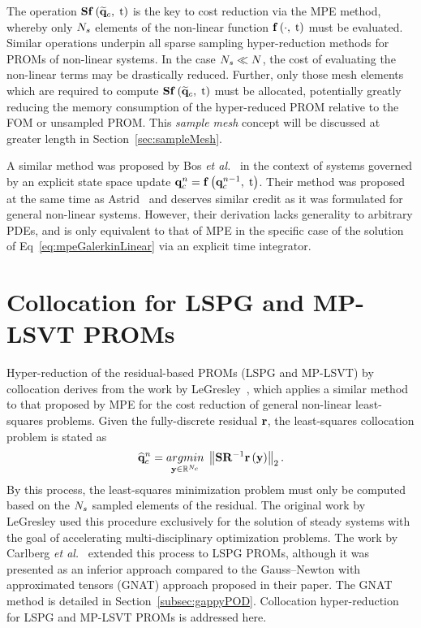 The operation $\mathbf{S} \mathbf{f} \left(\mathbf{\widetilde{q}}_{c}, \; \text{t}\right)$ is the key to cost reduction via the MPE method, whereby only $N_s$ elements of the non-linear function $\mathbf{f} \left(\cdot, \; \text{t}\right)$ must be evaluated. Similar operations underpin all sparse sampling hyper-reduction methods for PROMs of non-linear systems. In the case $N_s \ll N$, the cost of evaluating the non-linear terms may be drastically reduced. Further, only those mesh elements which are required to compute $\mathbf{S} \mathbf{f} \left(\mathbf{\widetilde{q}}_{c}, \; \text{t}\right)$ must be allocated, potentially greatly reducing the memory consumption of the hyper-reduced PROM relative to the FOM or unsampled PROM. This \textit{sample mesh} concept will be discussed at greater length in Section~\ref{sec:sampleMesh}.

A similar method was proposed by Bos \textit{et al.}~\cite{Bos2004} in the context of systems governed by an explicit state space update $\mathbf{q}_{c}^{n} = \mathbf{f} \left(\mathbf{q}_{c}^{n - 1}, \; \text{t}\right)$. Their method was proposed at the same time as Astrid~\cite{Astrid2004} and deserves similar credit as it was formulated for general non-linear systems. However, their derivation lacks generality to arbitrary PDEs, and is only equivalent to that of MPE in the specific case of the solution of Eq~\ref{eq:mpeGalerkinLinear} via an explicit time integrator.

\section{Collocation for LSPG and MP-LSVT PROMs}

Hyper-reduction of the residual-based PROMs (LSPG and MP-LSVT) by collocation derives from the work by LeGresley~\cite{LeGresley2005}, which applies a similar method to that proposed by MPE for the cost reduction of general non-linear least-squares problems. Given the fully-discrete residual $\mathbf{r}$, the least-squares collocation problem is stated as
%
\begin{equation}\label{eq:collocLSPG}
	\consVecCoef^{\timeIdx} = \argmin{\dummyVec \inROne{\numConsModes}} \left\Vert \sampMat \resScaleInv \resFunc{\dummyVec} \right\Vert_2.
\end{equation}
%
By this process, the least-squares minimization problem must only be computed based on the $N_s$ sampled elements of the residual. The original work by LeGresley used this procedure exclusively for the solution of steady systems with the goal of accelerating multi-disciplinary optimization problems. The work by Carlberg \textit{et al.}~\cite{Carlberg2013} extended this process to LSPG PROMs, although it was presented as an inferior approach compared to the Gauss--Newton with approximated tensors (GNAT) approach proposed in their paper. The GNAT method is detailed in Section~\ref{subsec:gappyPOD}. Collocation hyper-reduction for LSPG and MP-LSVT PROMs is addressed here.

